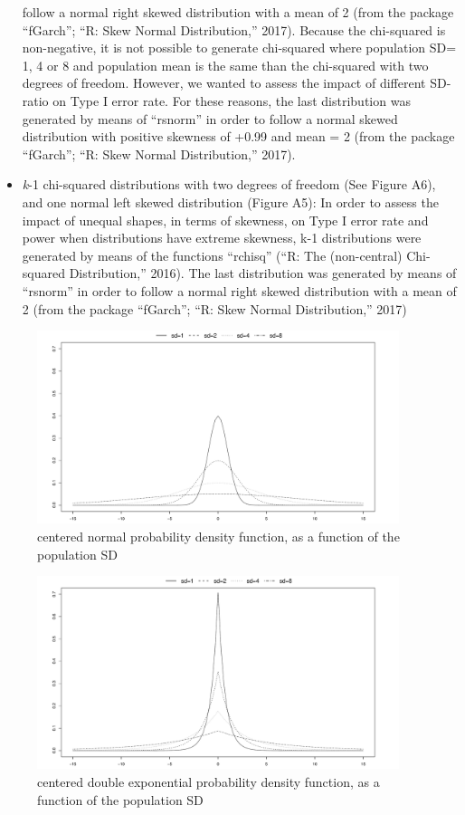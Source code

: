 \documentclass[man,floatsintext]{apa6}
\begin{document}
\begin{appendix}
\begin{itemize}
follow a normal right skewed distribution with a mean of 2 (from the
package ``fGarch''; ``R: Skew Normal Distribution,'' 2017). Because
the chi-squared is non-negative, it is not possible to generate
chi-squared where population SD= 1, 4 or 8 and population mean is the
same than the chi-squared with two degrees of freedom. However, we
wanted to assess the impact of different SD-ratio on Type I error
rate. For these reasons, the last distribution was generated by means
of ``rsnorm'' in order to follow a normal skewed distribution with
positive skewness of +0.99 and mean = 2 (from the package ``fGarch'';
``R: Skew Normal Distribution,'' 2017).
\item
\emph{k}-1 chi-squared distributions with two degrees of freedom (See
Figure A6), and one normal left skewed distribution (Figure A5): In
order to assess the impact of unequal shapes, in terms of skewness, on
Type I error rate and power when distributions have extreme skewness,
k-1 distributions were generated by means of the functions ``rchisq''
(``R: The (non-central) Chi-squared Distribution,'' 2016). The last
distribution was generated by means of ``rsnorm'' in order to follow a
normal right skewed distribution with a mean of 2 (from the package
``fGarch''; ``R: Skew Normal Distribution,'' 2017)
\end{itemize}

\begin{figure}
\includegraphics[width=400px]{W-test_files/figure-latex/unnamed-chunk-18-1} \caption{centered normal probability density function, as a function of the population SD}\label{fig:unnamed-chunk-18}
\end{figure}

\begin{figure}
\includegraphics[width=400px]{W-test_files/figure-latex/unnamed-chunk-19-1} \caption{centered double exponential probability density function, as a function of the population SD}\label{fig:unnamed-chunk-19}
\end{figure}


\end{appendix}
\end{document}
